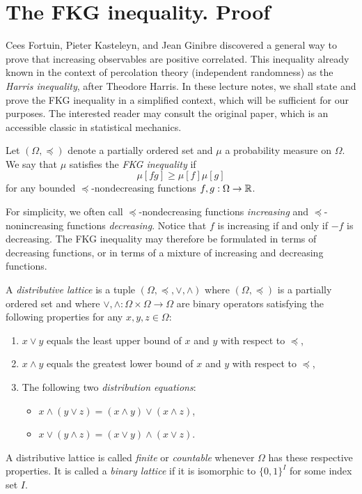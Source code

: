\section{The FKG inequality. Proof}

Cees Fortuin, Pieter Kasteleyn, and Jean Ginibre discovered a general
way to prove that increasing observables are positive correlated.
This inequality already known in the context of percolation
theory (independent randomness) as the \emph{Harris inequality},
after Theodore Harris.
In these lecture notes, we shall state and prove the FKG inequality in a simplified
context, which will be sufficient for our purposes.
The interested reader may consult the original paper, which is an accessible classic in statistical mechanics.

\begin{definition}
    Let $(\Omega,\preceq)$ denote a partially ordered set
    and $\mu$ a probability measure on $\Omega$.
    We say that $\mu$ satisfies the \emph{FKG inequality}
    if
    \begin{equation}
        \label{eq:FKG}
        \mu[fg]\geq \mu[f]\mu[g]
    \end{equation}
    for any bounded $\preceq$-nondecreasing functions
    $f,g:\Omega\to\mathbb R$.
\end{definition}

For simplicity, we often call $\preceq$-nondecreasing functions \emph{increasing}
and $\preceq$-nonincreasing functions \emph{decreasing}.
Notice that $f$ is increasing if and only if $-f$ is decreasing.
The FKG inequality may therefore be formulated in terms of decreasing functions,
or in terms of a mixture of increasing and decreasing functions.

\begin{definition}
    A \emph{distributive lattice} is a tuple $(\Omega,\preceq,\vee,\wedge)$
    where $(\Omega,\preceq)$ is a partially ordered set
    and where $\vee,\wedge:\Omega\times\Omega\to\Omega$
    are binary operators satisfying the following properties
    for any $x,y,z\in\Omega$:
    \begin{enumerate}
        \item $x\vee y$ equals the least upper bound of $x$ and $y$ with respect to $\preceq$,
        \item $x\wedge y$ equals the greatest lower bound of $x$ and $y$ with respect to $\preceq$,
        \item The following two \emph{distribution equations}:
        \begin{itemize}
            \item $x\wedge (y\vee z)=(x\wedge y)\vee(x\wedge z)$,
            \item $x\vee (y\wedge z)=(x\vee y)\wedge(x\vee z)$.
        \end{itemize}
    \end{enumerate}
    A distributive lattice is called \emph{finite} or \emph{countable}
    whenever $\Omega$ has these respective properties.
    It is called a \emph{binary lattice} if it is isomorphic
    to $\{0,1\}^I$ for some index set $I$.
\end{definition}


